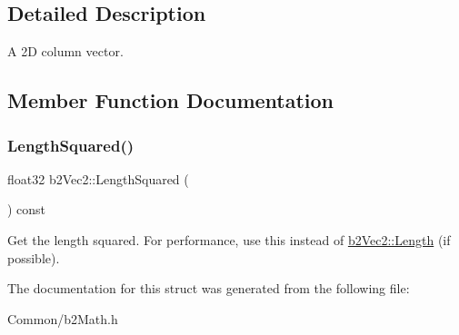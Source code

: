 \subsection{Detailed Description}
A 2D column vector. 

\subsection{Member Function Documentation}
\mbox{\label{structb2Vec2_af8a081dac7eea7800fdbfbf95ac9e395}} 
\subsubsection{\texorpdfstring{Length\+Squared()}{LengthSquared()}}
{\footnotesize\ttfamily float32 b2\+Vec2\+::\+Length\+Squared (\begin{DoxyParamCaption}{ }\end{DoxyParamCaption}) const\hspace{0.3cm}{\ttfamily [inline]}}

Get the length squared. For performance, use this instead of \mbox{\hyperlink{structb2Vec2_a04cb9ac9e845a59f4212b2d7149fa3d9}{b2\+Vec2\+::\+Length}} (if possible). 

The documentation for this struct was generated from the following file\+:\begin{DoxyCompactItemize}
\item 
Common/b2\+Math.\+h\end{DoxyCompactItemize}
